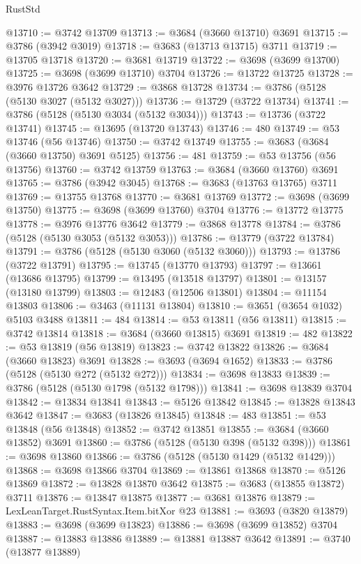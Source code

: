 \begin{lexlean}{RustStd}
\begin{coremodule}
@13710 := @3742 @13709
@13713 := @3684 (@3660 @13710) @3691
@13715 := @3786 (@3942 @3019)
@13718 := @3683 (@13713 @13715) @3711
@13719 := @13705 @13718
@13720 := @3681 @13719
@13722 := @3698 (@3699 @13700)
@13725 := @3698 (@3699 @13710) @3704
@13726 := @13722 @13725
@13728 := @3976 @13726 @3642
@13729 := @3868 @13728
@13734 := @3786 (@5128 (@5130 @3027 (@5132 @3027)))
@13736 := @13729 (@3722 @13734)
@13741 := @3786 (@5128 (@5130 @3034 (@5132 @3034)))
@13743 := @13736 (@3722 @13741)
@13745 := @13695 (@13720 @13743)
@13746 := 480
@13749 := @53 @13746 (@56 @13746)
@13750 := @3742 @13749
@13755 := @3683 (@3684 (@3660 @13750) @3691 @5125)
@13756 := 481
@13759 := @53 @13756 (@56 @13756)
@13760 := @3742 @13759
@13763 := @3684 (@3660 @13760) @3691
@13765 := @3786 (@3942 @3045)
@13768 := @3683 (@13763 @13765) @3711
@13769 := @13755 @13768
@13770 := @3681 @13769
@13772 := @3698 (@3699 @13750)
@13775 := @3698 (@3699 @13760) @3704
@13776 := @13772 @13775
@13778 := @3976 @13776 @3642
@13779 := @3868 @13778
@13784 := @3786 (@5128 (@5130 @3053 (@5132 @3053)))
@13786 := @13779 (@3722 @13784)
@13791 := @3786 (@5128 (@5130 @3060 (@5132 @3060)))
@13793 := @13786 (@3722 @13791)
@13795 := @13745 (@13770 @13793)
@13797 := @13661 (@13686 @13795)
@13799 := @13495 (@13518 @13797)
@13801 := @13157 (@13180 @13799)
@13803 := @12483 (@12506 @13801)
@13804 := @11154 @13803
@13806 := @3463 (@11131 @13804)
@13810 := @3651 (@3654 @1032) @5103 @3488
@13811 := 484
@13814 := @53 @13811 (@56 @13811)
@13815 := @3742 @13814
@13818 := @3684 (@3660 @13815) @3691
@13819 := 482
@13822 := @53 @13819 (@56 @13819)
@13823 := @3742 @13822
@13826 := @3684 (@3660 @13823) @3691
@13828 := @3693 (@3694 @1652)
@13833 := @3786 (@5128 (@5130 @272 (@5132 @272)))
@13834 := @3698 @13833
@13839 := @3786 (@5128 (@5130 @1798 (@5132 @1798)))
@13841 := @3698 @13839 @3704
@13842 := @13834 @13841
@13843 := @5126 @13842
@13845 := @13828 @13843 @3642
@13847 := @3683 (@13826 @13845)
@13848 := 483
@13851 := @53 @13848 (@56 @13848)
@13852 := @3742 @13851
@13855 := @3684 (@3660 @13852) @3691
@13860 := @3786 (@5128 (@5130 @398 (@5132 @398)))
@13861 := @3698 @13860
@13866 := @3786 (@5128 (@5130 @1429 (@5132 @1429)))
@13868 := @3698 @13866 @3704
@13869 := @13861 @13868
@13870 := @5126 @13869
@13872 := @13828 @13870 @3642
@13875 := @3683 (@13855 @13872) @3711
@13876 := @13847 @13875
@13877 := @3681 @13876
@13879 := LexLeanTarget.RustSyntax.Item.bitXor @23
@13881 := @3693 (@3820 @13879)
@13883 := @3698 (@3699 @13823)
@13886 := @3698 (@3699 @13852) @3704
@13887 := @13883 @13886
@13889 := @13881 @13887 @3642
@13891 := @3740 (@13877 @13889)

\end{coremodule}
\end{lexlean}
